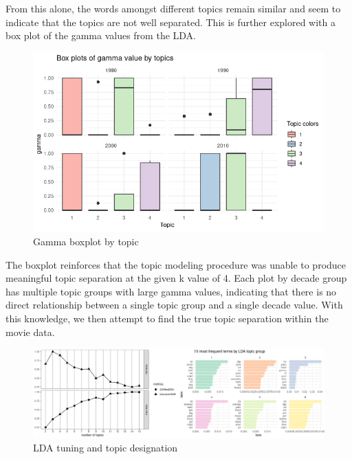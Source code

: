 \documentclass[
  authoryear,
  preprint]{elsarticle}
\begin{document}
From this alone, the words amongst different topics remain similar and
seem to indicate that the topics are not well separated. This is further
explored with a box plot of the gamma values from the LDA.

\begin{figure}[H]

{\centering \includegraphics{images/boxplottopic.png}

}

\caption{Gamma boxplot by topic}

\end{figure}%

The boxplot reinforces that the topic modeling procedure was unable to
produce meaningful topic separation at the given k value of 4. Each plot
by decade group has multiple topic groups with large gamma values,
indicating that there is no direct relationship between a single topic
group and a single decade value. With this knowledge, we then attempt to
find the true topic separation within the movie data.

\begin{figure}[H]

{\centering \includegraphics{images/lda6-imageonline.co-merged.png}

}

\caption{LDA tuning and topic designation}

\end{figure}%
\end{document}
